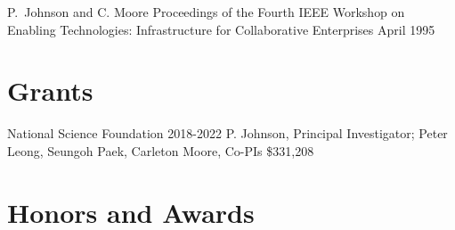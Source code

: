 \documentclass[11pt,letterpaper,sans]{moderncv} %
\begin{document}
    {P.~Johnson and C. Moore}
    {Proceedings of the Fourth IEEE Workshop on Enabling Technologies: Infrastructure for Collaborative Enterprises}
    {April 1995}



    \section{Grants}

    {National Science Foundation} %
    {2018-2022} %
    {P. Johnson, Principal Investigator; Peter Leong, Seungoh Paek, Carleton Moore, Co-PIs}  %
    {\$331,208} %


    \section{Honors and Awards}

\end{document}
